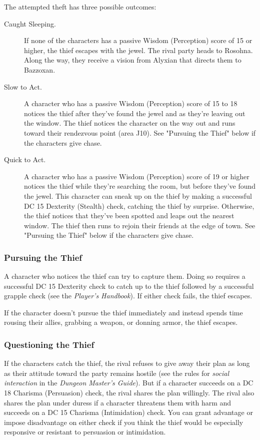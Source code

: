 \documentclass[10pt,a4paper,twoside,fancy,bg=print,twocolumn,openany,nodeprecatedcode]{dndbook}
\begin{document}
The attempted theft has three possible outcomes:


\begin{description}
\item[Caught Sleeping.]
If none of the characters has a passive Wisdom (Perception) score of 15 or higher, the thief escapes with the jewel. The rival party heads to Rosohna. Along the way, they receive a vision from Alyxian that directs them to Bazzoxan.
\item[Slow to Act.]
A character who has a passive Wisdom (Perception) score of 15 to 18 notices the thief after they've found the jewel and as they're leaving out the window. The thief notices the character on the way out and runs toward their rendezvous point (area J10). See "Pursuing the Thief" below if the characters give chase.
\item[Quick to Act.]
A character who has a passive Wisdom (Perception) score of 19 or higher notices the thief while they're searching the room, but before they've found the jewel. This character can sneak up on the thief by making a successful DC 15 Dexterity (Stealth) check, catching the thief by surprise. Otherwise, the thief notices that they've been spotted and leaps out the nearest window. The thief then runs to rejoin their friends at the edge of town. See "Pursuing the Thief" below if the characters give chase.
\end{description}

\subsubsection{Pursuing the Thief}
A character who notices the thief can try to capture them. Doing so requires a successful DC 15 Dexterity check to catch up to the thief followed by a successful grapple check (see the \textit{Player's Handbook}). If either check fails, the thief escapes.

If the character doesn't pursue the thief immediately and instead spends time rousing their allies, grabbing a weapon, or donning armor, the thief escapes.

\subsubsection{Questioning the Thief}
If the characters catch the thief, the rival refuses to give away their plan as long as their attitude toward the party remains hostile (see the rules for \textit{social interaction} in the \textit{Dungeon Master's Guide}). But if a character succeeds on a DC 18 Charisma (Persuasion) check, the rival shares the plan willingly. The rival also shares the plan under duress if a character threatens them with harm and succeeds on a DC 15 Charisma (Intimidation) check. You can grant advantage or impose disadvantage on either check if you think the thief would be especially responsive or resistant to persuasion or intimidation.
\end{document}
